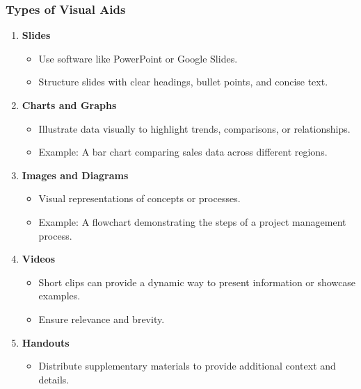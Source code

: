 \documentclass{beamer}
\begin{document}
\begin{frame}[fragile]
    \frametitle{Types of Visual Aids}
    \begin{enumerate}
        \item \textbf{Slides}
        \begin{itemize}
            \item Use software like PowerPoint or Google Slides.
            \item Structure slides with clear headings, bullet points, and concise text.
        \end{itemize}
        
        \item \textbf{Charts and Graphs}
        \begin{itemize}
            \item Illustrate data visually to highlight trends, comparisons, or relationships.
            \item Example: A bar chart comparing sales data across different regions.
        \end{itemize}
        
        \item \textbf{Images and Diagrams}
        \begin{itemize}
            \item Visual representations of concepts or processes.
            \item Example: A flowchart demonstrating the steps of a project management process.
        \end{itemize}
        
        \item \textbf{Videos}
        \begin{itemize}
            \item Short clips can provide a dynamic way to present information or showcase examples.
            \item Ensure relevance and brevity.
        \end{itemize}
        
        \item \textbf{Handouts}
        \begin{itemize}
            \item Distribute supplementary materials to provide additional context and details.
        \end{itemize}
    \end{enumerate}
\end{frame}
\end{document}
